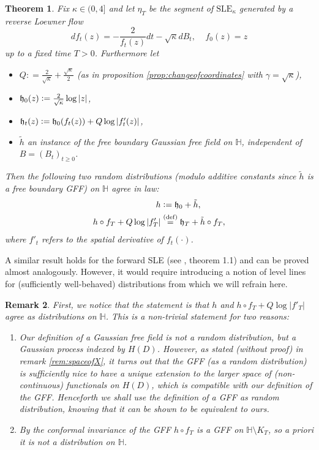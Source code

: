 \documentclass[11pt,reqno]{amsart}
\numberwithin{equation}{section}
\newtheorem{thm}{Theorem}[section]
\newtheorem{rem}[thm]{Remark}
\newcommand{\eqbydef}{\mathrel{\stackrel{\text{(def)}}{=}}}
\newcommand{\deq}{\mathrel{\mathop:}=}
\newcommand{\fh}{{\frak h}}
\begin{document}
\begin{thm}
	Fix $\kappa\in (0,4]$ and let $\eta_T$ be the segment of $\text{SLE}_\kappa$ generated by a reverse Loewner flow \begin{equation}\label{eq:defOfLoewnerFlow}
		df_t(z)=-\frac{2}{f_t(z)}dt-\sqrt\kappa dB_t, \;\;\;\; f_0(z)=z
	\end{equation}
	up to a fixed time $T>0$. Furthermore let \begin{itemize}
		\item $Q\deq\frac{2}{\sqrt\kappa}+\frac{\sqrt\kappa}{2}$ (as in proposition \ref{prop:changeofcoordinates} with $\gamma=\sqrt\kappa$),
		\item $\fh_0(z)\deq\frac{2}{\sqrt\kappa}\log|z|$,
		\item $\fh_t(z)\deq\fh_0(f_t(z))+Q\log|f'_t(z)|$,
		\item $\tilde h$ an instance of the free boundary Gaussian free field on $\mathbb H$, independent of $B=(B_t)_{t\geq 0}$.
	\end{itemize}
	Then the following two random distributions (modulo additive constants since $\tilde h$ is a \emph{free boundary} GFF) on $\mathbb H$ agree in law:
	\begin{align*}
		h&\deq \fh_0+\tilde h,\\
		h\circ f_T+Q\log|f'_T|&\eqbydef\fh_T+\tilde h\circ f_T,
	\end{align*}
	where $f'_t$ refers to the spatial derivative of $f_t(\cdot)$.
\end{thm}
A similar result holds for the forward SLE (see \cite{She15}, theorem 1.1) and can be proved almost analogously. However, it would require introducing a notion of level lines for (sufficiently well-behaved) distributions from which we will refrain here.
\begin{rem}
	First, we notice that the statement is that $h$ and $h\circ f_T+Q\log|f'_T|$ agree as distributions on $\mathbb H$. This is a non-trivial statement for two reasons:
	\begin{enumerate}
		\item Our definition of a Gaussian free field is not a random distribution, but a Gaussian process indexed by $H(D)$. However, as stated (without proof) in remark \ref{rem:spaceofX}, it turns out that the GFF (as a random distribution) is sufficiently nice to have a unique extension to the larger space of (non-continuous) functionals on $H(D)$, which is compatible with our definition of the GFF. Henceforth we shall use the definition of a GFF as random distribution, knowing that it can be shown to be equivalent to ours.
		\item By the conformal invariance of the GFF $h\circ f_T$ is a GFF on $\mathbb H\setminus K_T$, so a priori it is not a distribution on $\mathbb H$. 
	\end{enumerate}
\end{rem}
\end{document}
